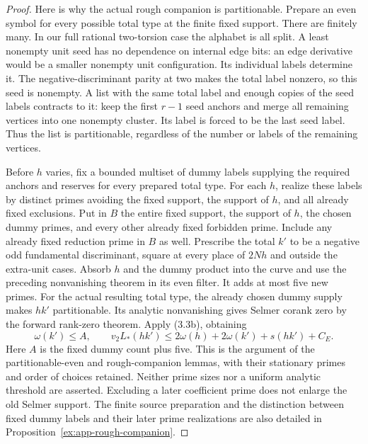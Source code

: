 \documentclass[11pt]{article}
\theoremstyle{definition}
\theoremstyle{remark}
\begin{document}
\begin{proof}\leavevmode

Here is why the actual rough companion is partitionable.
Prepare an even symbol for every possible total type at the finite
fixed support. There are finitely many. In our full rational
two-torsion case the alphabet is all split. A least nonempty unit
seed has no dependence on internal edge bits: an edge derivative
would be a smaller nonempty unit configuration. Its individual
labels determine it. The negative-discriminant parity at two makes
the total label nonzero, so this seed is nonempty.
A list with the same total label and enough copies of the seed
labels contracts to it: keep the first $r-1$ seed anchors and merge
all remaining vertices into one nonempty cluster. Its label is
forced to be the last seed label. Thus the list is partitionable,
regardless of the number or labels of the remaining vertices.

Before $h$ varies, fix a bounded multiset of dummy labels supplying
the required anchors and reserves for every prepared total type.
For each $h$, realize these labels by distinct primes avoiding the
fixed support, the support of $h$, and all already fixed exclusions.
Put in $B$ the entire fixed support, the support of $h$, the chosen
dummy primes, and every other already fixed forbidden prime.
Include any already fixed reduction prime in $B$ as well.
Prescribe the total $k'$ to be a negative odd fundamental
discriminant, square at every place of $2Nh$ and outside the
extra-unit cases. Absorb $h$ and the dummy product into the curve
and use the preceding nonvanishing theorem in its even filter.
It adds at most five new primes. For the actual resulting total
type, the already chosen dummy supply makes $hk'$ partitionable.
Its analytic nonvanishing gives Selmer corank zero by the forward
rank-zero theorem. Apply (3.3b), obtaining
\[
 \omega(k')\le A,\qquad
 v_2L_*(hk')\le 2\omega(h)+2\omega(k')+s(hk')+C_E.                \tag{3.3}
\]
Here $A$ is the fixed dummy count plus five. This is the argument
of the partitionable-even and rough-companion lemmas, with their
stationary primes and order of choices retained.
Neither prime sizes nor a uniform analytic threshold are asserted.
Excluding a later coefficient prime does not enlarge the old
Selmer support.
The finite source preparation and the distinction between fixed dummy
labels and their later prime realizations are also detailed in
Proposition~\ref{ex:app-rough-companion}.
\end{proof}
\end{document}
